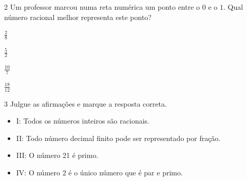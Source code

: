 

\num{2} Um professor marcou numa reta numérica um ponto entre o $0$ e o $1$. Qual
número racional melhor representa este ponto?

\begin{escolha}
    \item $\frac{2}{8}$
    \item $\frac{5}{2}$
    \item $\frac{10}{7}$
    \item $\frac{18}{12}$
\end{escolha}



\num{3} Julgue as afirmações e marque a resposta correta.

\begin{itemize}
\item I: Todos os números inteiros são racionais.
\item II: Todo número decimal finito pode ser representado por fração.
\item III: O número 21 é primo.
\item IV: O número 2 é o único número que é par e primo.
\end{itemize}

